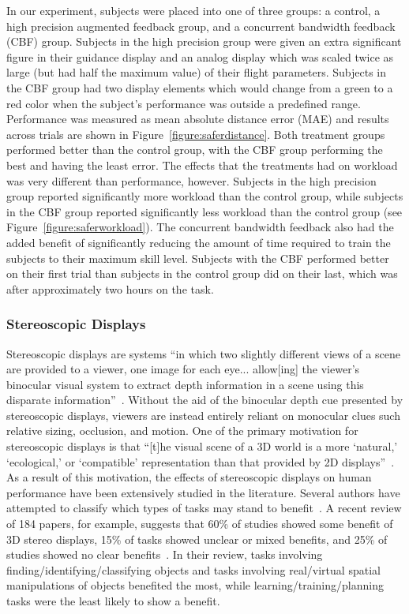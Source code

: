 In our experiment, subjects were placed into one of three groups: a control, a high precision augmented feedback group, and a concurrent bandwidth feedback (CBF) group.
Subjects in the high precision group were given an extra significant figure in their guidance display and an analog display which was scaled twice as large (but had half the maximum value) of their flight parameters.
Subjects in the CBF group had two display elements which would change from a green to a red color when the subject's performance was outside a predefined range.
Performance was measured as mean absolute distance error (MAE) and results across trials are shown in Figure~\ref{figure:saferdistance}.
Both treatment groups performed better than the control group, with the CBF group performing the best and having the least error.
The effects that the treatments had on workload was very different than performance, however.
Subjects in the high precision group reported significantly more workload than the control group, while subjects in the CBF group reported significantly less workload than the control group (see Figure~\ref{figure:saferworkload}).
The concurrent bandwidth feedback also had the added benefit of significantly reducing the amount of time required to train the subjects to their maximum skill level.
Subjects with the CBF performed better on their first trial than subjects in the control group did on their last, which was after approximately two hours on the task.

\subsubsection{Stereoscopic Displays}
Stereoscopic displays are systems ``in which two slightly different views of a scene are provided to a viewer, one image for each eye... allow[ing] the viewer's binocular visual system to extract depth information in a scene using this disparate information''~\citep{mcintire_stereoscopic_2014}.
Without the aid of the binocular depth cue presented by stereoscopic displays, viewers are instead entirely reliant on monocular clues such relative sizing, occlusion, and motion.
One of the primary motivation for stereoscopic displays is that ``[t]he visual scene of a 3D world is a more `natural,' `ecological,' or `compatible' representation than that provided by 2D displays''~\citep{wickens_three-dimensional_1990}.
As a result of this motivation, the effects of stereoscopic displays on human performance have been extensively studied in the literature.
Several authors have attempted to classify which types of tasks may stand to benefit~\citep{mcintire_stereoscopic_2014, wickens_three-dimensional_1990, wickens_three-dimensional_1989, naikar_perspective_1998, dixon_human_2009}.
A recent review of 184 papers, for example, suggests that 60\% of studies showed some benefit of 3D stereo displays, 15\% of tasks showed unclear or mixed benefits, and 25\% of studies showed no clear benefits~\citep{mcintire_stereoscopic_2014}.
In their review, tasks involving finding/identifying/classifying objects and tasks involving real/virtual spatial manipulations of objects benefited the most, while learning/training/planning tasks were the least likely to show a benefit.

